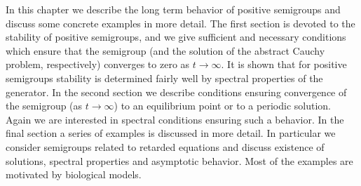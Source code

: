 \label{chap:c4}%
\thispagestyle{empty}
In this chapter we describe the long term behavior of positive semigroups and discuss some concrete examples in more detail.
The first section is devoted to the stability of positive semigroups, and we give sufficient and necessary conditions which ensure that the semigroup (and the solution of the abstract Cauchy problem, respectively) converges to zero as $t \to \infty$.
It is shown that for positive semigroups stability is determined fairly well by spectral properties of the generator.
In the second section we describe conditions ensuring convergence of the semigroup (as $t \to \infty$) to an equilibrium point or to a periodic solution.
Again we are interested in spectral conditions ensuring such a behavior.
In the final section a series of examples is discussed in more detail.
In particular we consider semigroups related to retarded equations and discuss existence of solutions, spectral properties and asymptotic behavior.
Most of the examples are motivated by biological models.

